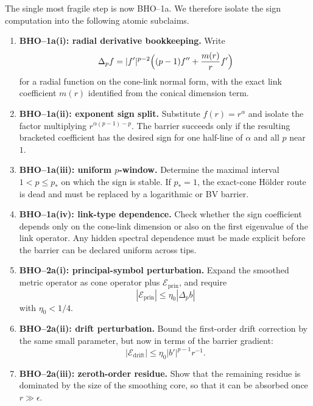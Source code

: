 \begin{remark}
\label{rem:TipNeckNanoscopicBarrierRoadmap}
The single most fragile step is now BHO--1a.  We therefore isolate the sign
computation into the following atomic subclaims.
\begin{enumerate}
    \item \textbf{BHO--1a(i): radial derivative bookkeeping.}
    Write
    \[
        \Delta_p f = |f'|^{p-2}\Bigl((p-1)f'' + \frac{m(r)}{r}f'\Bigr)
    \]
    for a radial function on the cone-link normal form, with the exact link
    coefficient \(m(r)\) identified from the conical dimension term.

    \item \textbf{BHO--1a(ii): exponent sign split.}
    Substitute \(f(r)=r^\alpha\) and isolate the factor multiplying
    \(r^{\alpha(p-1)-p}\).  The barrier succeeds only if the resulting
    bracketed coefficient has the desired sign for one half-line of \(\alpha\)
    and all \(p\) near \(1\).

    \item \textbf{BHO--1a(iii): uniform \(p\)-window.}
    Determine the maximal interval \(1<p\le p_*\) on which the sign is stable.
    If \(p_*=1\), the exact-cone Hölder route is dead and must be replaced by a
    logarithmic or BV barrier.

    \item \textbf{BHO--1a(iv): link-type dependence.}
    Check whether the sign coefficient depends only on the cone-link dimension
    or also on the first eigenvalue of the link operator.  Any hidden spectral
    dependence must be made explicit before the barrier can be declared
    uniform across tips.

    \item \textbf{BHO--2a(i): principal-symbol perturbation.}
    Expand the smoothed metric operator as cone operator plus
    \(\mathcal E_{\mathrm{prin}}\), and require
    \[
        |\mathcal E_{\mathrm{prin}}| \le \eta_0 |\Delta_p b|
    \]
    with \(\eta_0<1/4\).

    \item \textbf{BHO--2a(ii): drift perturbation.}
    Bound the first-order drift correction by the same small parameter, but now
    in terms of the barrier gradient:
    \[
        |\mathcal E_{\mathrm{drift}}|
        \le \eta_0 |b'|^{p-1}r^{-1}.
    \]

    \item \textbf{BHO--2a(iii): zeroth-order residue.}
    Show that the remaining residue is dominated by the size of the smoothing
    core, so that it can be absorbed once \(r\gg\epsilon\).


\end{enumerate}
\end{remark}
